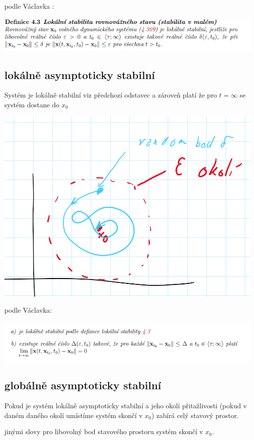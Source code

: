 podle Václavka :

 \includegraphics{img/vaclave.lok.png}

 \subsection{lokálně asymptoticky stabilní}
Systém je lokálně stabilní viz předchozí odstavec a zároveň platí že pro $t=\infty$ se systém dostane do $x_0$

\includegraphics[scale = 0.6]{img/lok.asypt.stab.png}

podle Václavka:

\includegraphics{img/vaclavek. lok.asypt..png}

\subsection{globálně  asymptoticky stabilní}
Pokud je systém lokálně asymptoticky stabilní a jeho okolí přitažlivosti (pokud v daném daného okolí umístíme systém skončí v $x_0$) zabírá 
celý stavový prostor.

jinými slovy pro libovolný bod stavového prostoru systém skončí v $x_0$.


